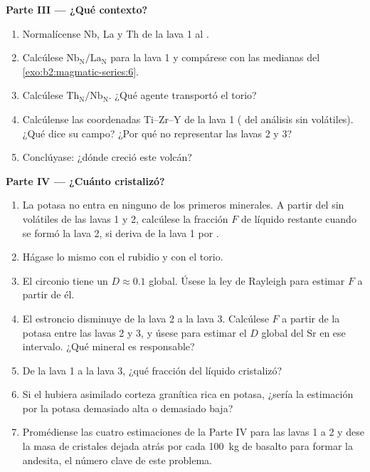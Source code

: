 \begin{problem}
\noindent\textbf{Parte III --- ¿Qué contexto?}
\begin{enumerate}[resume]
\item Normalícense Nb, La y Th de la lava 1 al .
\item Calcúlese $\mathrm{Nb_N}/\mathrm{La_N}$ para la lava 1 y compárese con las medianas
del \cref{exo:b2:magmatic-series:6}.
\item Calcúlese $\mathrm{Th_N}/\mathrm{Nb_N}$. ¿Qué agente transportó el torio?
\item Calcúlense las coordenadas Ti--Zr--Y de la lava 1 ( del análisis sin
volátiles). ¿Qué dice su campo? ¿Por qué no representar las lavas 2 y 3?
\item Conclúyase: ¿dónde creció este volcán?
\end{enumerate}

\noindent\textbf{Parte IV --- ¿Cuánto cristalizó?}
\begin{enumerate}[resume]
\item La potasa no entra en ninguno de los primeros minerales. A partir del  sin volátiles de
las lavas 1 y 2, calcúlese la fracción $F$ de líquido restante cuando se formó la lava 2, si
deriva de la lava 1 por .
\item Hágase lo mismo con el rubidio y con el torio.
\item El circonio tiene un $D \approx 0.1$ global. Úsese la ley de Rayleigh para estimar $F$ a partir
de él.
\item El estroncio disminuye de la lava 2 a la lava 3. Calcúlese $F$ a partir de la potasa entre las lavas 2 y
3, y úsese para estimar el $D$ global del Sr en ese intervalo. ¿Qué mineral es
responsable?
\item De la lava 1 a la lava 3, ¿qué fracción del líquido cristalizó?
\item Si el  hubiera asimilado corteza granítica rica en potasa, ¿sería la estimación por la potasa
demasiado alta o demasiado baja?
\item Promédiense las cuatro estimaciones de la Parte IV para las lavas 1 a 2 y dese la masa de
cristales dejada atrás por cada \qty{100}{kg} de basalto para formar la andesita, el número clave
de este problema.
\end{enumerate}
\end{problem}
